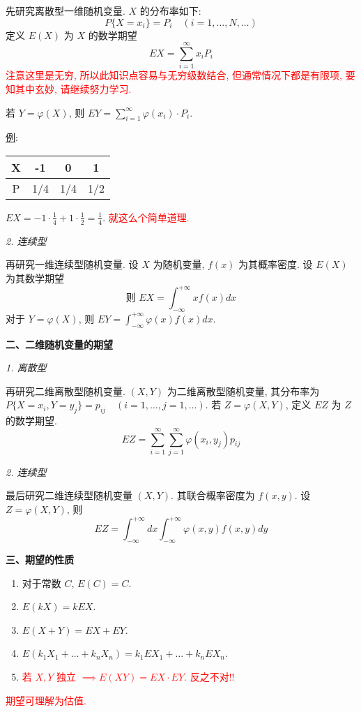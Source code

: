 \documentclass[padp]{ExBook}
\begin{document}
先研究离散型一维随机变量.
$X$ 的分布率如下:
$$ P\{X=x_i\} = P_i \quad (i=1, \dots, N, \dots) $$
定义 $E(X)$ 为 $X$ 的数学期望
$$ EX = \sum_{i=1}^{\infty} x_i P_i $$
\textcolor{red}{注意这里是无穷, 所以此知识点容易与无穷级数结合, 但通常情况下都是有限项, 要知其中玄妙, 请继续努力学习.}

若 $Y=\varphi(X)$, 则 $EY = \sum_{i=1}^{\infty} \varphi(x_i) \cdot P_i$.

\underline{例}:
\begin{center}
\begin{tabular}{|c|c|c|c|}
\hline
X & -1 & 0 & 1 \\
\hline
P & 1/4 & 1/4 & 1/2 \\
\hline
\end{tabular}
\end{center}
$EX = -1 \cdot \frac{1}{4} + 1 \cdot \frac{1}{2} = \frac{1}{4}$. \textcolor{red}{就这么个简单道理.}

\vspace{1em}
\textit{2. 连续型}
\vspace{0.5em}

再研究一维连续型随机变量.
设 $X$ 为随机变量, $f(x)$ 为其概率密度.
设 $E(X)$ 为其数学期望
$$ \text{则 } EX = \int_{-\infty}^{+\infty} x f(x) dx $$
对于 $Y=\varphi(X)$, 则 $EY = \int_{-\infty}^{+\infty} \varphi(x) f(x) dx$.

\hrulefill
\vspace{1em}

\textbf{二、二维随机变量的期望}
\vspace{0.5em}

\textit{1. 离散型}
\vspace{0.5em}

再研究二维离散型随机变量.
$(X,Y)$ 为二维离散型随机变量, 其分布率为 $P\{X=x_i, Y=y_j\} = p_{ij} \quad (i=1,\dots, j=1,\dots)$.
若 $Z=\varphi(X,Y)$, 定义 $EZ$ 为 $Z$ 的数学期望.
$$ EZ = \sum_{i=1}^{\infty}\sum_{j=1}^{\infty} \varphi(x_i, y_j) p_{ij} $$

\vspace{1em}
\textit{2. 连续型}
\vspace{0.5em}

最后研究二维连续型随机变量 $(X,Y)$.
其联合概率密度为 $f(x,y)$.
设 $Z=\varphi(X,Y)$, 则
$$ EZ = \int_{-\infty}^{+\infty} dx \int_{-\infty}^{+\infty} \varphi(x,y) f(x,y) dy $$

\hrulefill
\vspace{1em}

\textbf{三、期望的性质}
\begin{enumerate}[label=(\arabic*), itemsep=3pt]
    \item 对于常数 $C$, $E(C) = C$.
    \item $E(kX) = kEX$.
    \item $E(X+Y) = EX+EY$.
    \item $E(k_1X_1 + \dots + k_nX_n) = k_1EX_1 + \dots + k_nEX_n$.
    \item \textcolor{red}{若 $X,Y$ 独立 $\implies E(XY)=EX \cdot EY$. 反之不对!!}
\end{enumerate}
\textcolor{red}{期望可理解为估值.}
\end{document}
